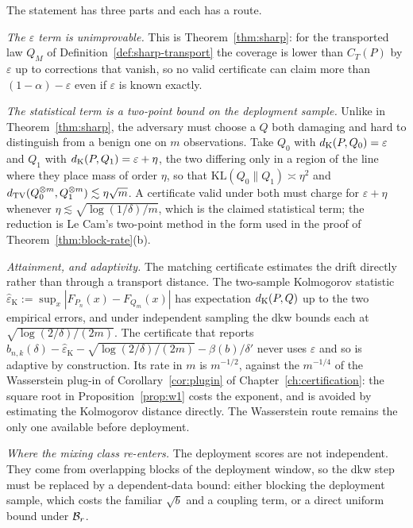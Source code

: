\documentclass[../../../main.tex]{subfiles}
\begin{document}
\begin{route}
The statement has three parts and each has a route.

\emph{The $\varepsilon$ term is unimprovable.} This is Theorem~\ref{thm:sharp}: for the transported law $Q_M$ of Definition~\ref{def:sharp-transport} the coverage is lower than $C_T(P)$ by $\varepsilon$ up to corrections that vanish, so no valid certificate can claim more than $(1-\alpha)-\varepsilon$ even if $\varepsilon$ is known exactly.

\emph{The statistical term is a two-point bound on the deployment sample.} Unlike in Theorem~\ref{thm:sharp}, the adversary must choose a $Q$ both damaging and hard to distinguish from a benign one on $m$ observations. Take $Q_0$ with $d_{\mathrm{K}}(P,Q_0)=\varepsilon$ and $Q_1$ with $d_{\mathrm{K}}(P,Q_1)=\varepsilon+\eta$, the two differing only in a region of the line where they place mass of order $\eta$, so that $\mathrm{KL}(Q_0\|Q_1)\asymp\eta^2$ and $d_{\mathrm{TV}}(Q_0^{\otimes m},Q_1^{\otimes m})\lesssim\eta\sqrt m$. A certificate valid under both must charge for $\varepsilon+\eta$ whenever $\eta\lesssim\sqrt{\log(1/\delta)/m}$, which is the claimed statistical term; the reduction is Le Cam's two-point method \citep[\S2.3, pp.~81--83]{tsybakov2009} in the form used in the proof of Theorem~\ref{thm:block-rate}(b).

\emph{Attainment, and adaptivity.} The matching certificate estimates the drift directly rather than through a transport distance. The two-sample Kolmogorov statistic $\hat\varepsilon_{\mathrm K}:=\sup_x|F_{P_n}(x)-F_{Q_m}(x)|$ has expectation $d_{\mathrm{K}}(P,Q)$ up to the two empirical errors, and under independent sampling the \gls{dkw} bounds each at $\sqrt{\log(2/\delta)/(2m)}$. The certificate that reports $b_{n,k}(\delta)-\hat\varepsilon_{\mathrm K}-\sqrt{\log(2/\delta)/(2m)}-\beta(b)/\delta'$ never uses $\varepsilon$ and so is adaptive by construction. Its rate in $m$ is $m^{-1/2}$, against the $m^{-1/4}$ of the Wasserstein plug-in of Corollary~\ref{cor:plugin} of Chapter~\ref{ch:certification}: the square root in Proposition~\ref{prop:w1} costs the exponent, and is avoided by estimating the Kolmogorov distance directly. The Wasserstein route remains the only one available before deployment.

\emph{Where the mixing class re-enters.} The deployment scores are not independent. They come from overlapping blocks of the deployment window, so the \gls{dkw} step must be replaced by a dependent-data bound: either blocking the deployment sample, which costs the familiar $\sqrt b$ and a coupling term, or a direct uniform bound under $\mathcal B_{r}$.
\end{route}
\end{document}
